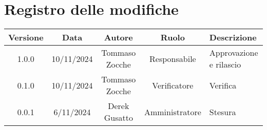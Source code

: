 
\section*{Registro delle modifiche}
\begin{table}[H]
    \begin{tabular}{|c|c|c|c|p{4cm}|}
        \hline
         \textbf{Versione} &  \textbf{Data} &  \textbf{Autore} &  \textbf{Ruolo} & \textbf{Descrizione} \\
          \hline
          1.0.0 & 10/11/2024 & Tommaso Zocche & Responsabile & Approvazione e rilascio \\
          \hline
          0.1.0 & 10/11/2024 & Tommaso Zocche & Verificatore &  Verifica \\
          \hline
          0.0.1 & 6/11/2024 & Derek Gusatto & Amministratore & Stesura \\
          \hline
    \end{tabular}
\end{table}